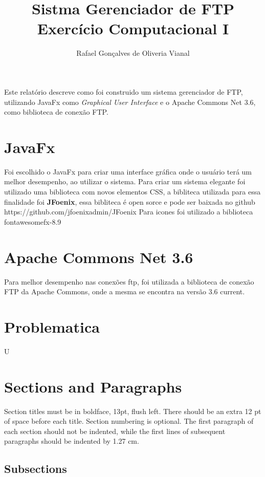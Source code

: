 \documentclass[12pt]{article}
\title{Sistma Gerenciador de FTP \\ Exercício Computacional I}
\author{Rafael Gonçalves de Oliveria Vianal\inst{1} }
\begin{document}
 

\maketitle

     
\begin{resumo} 
  Este relatório descreve como foi construido um sistema gerenciador de FTP, utilizando JavaFx como \textit{Graphical User Interface} e o Apache Commons Net 3.6, como biblioteca de conexão FTP.
\end{resumo}


\section{JavaFx}

Foi escolhido o JavaFx para criar uma interface gráfica onde o usuário terá um melhor desempenho, ao utilizar o sistema.
Para criar um sistema elegante foi utilizado uma biblioteca com novos elementos CSS, a bibliteca utilizada para essa finalidade foi  \textbf{JFoenix}, essa bibliteca é open sorce e pode ser baixada no github https://github.com/jfoenixadmin/JFoenix
Para icones foi utilizado a biblioteca fontawesomefx-8.9 
	
\section{Apache Commons Net 3.6} \label{sec:firstpage}

	Para melhor desempenho nas conexões ftp, foi utilizada a biblioteca de conexão FTP da Apache Commons, onde a mesma se encontra na versão 3.6 current.

\section{Problematica}

U

\section{Sections and Paragraphs}

Section titles must be in boldface, 13pt, flush left. There should be an extra
12 pt of space before each title. Section numbering is optional. The first
paragraph of each section should not be indented, while the first lines of
subsequent paragraphs should be indented by 1.27 cm.

\subsection{Subsections}
\end{document}
